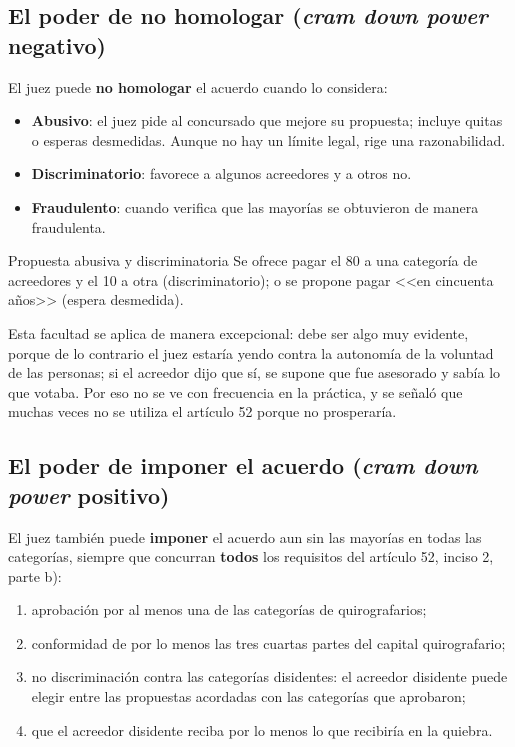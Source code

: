 \documentclass[12pt,oneside]{book}
\begin{document}
\subsection{El poder de no homologar (\emph{cram down power} negativo)}

El juez puede \textbf{no homologar} el acuerdo cuando lo considera:
\begin{itemize}
    \item \textbf{Abusivo}: el juez pide al concursado que mejore su propuesta; incluye quitas o esperas desmedidas. Aunque no hay un límite legal, rige una razonabilidad.
    \item \textbf{Discriminatorio}: favorece a algunos acreedores y a otros no.
    \item \textbf{Fraudulento}: cuando verifica que las mayorías se obtuvieron de manera fraudulenta.
\end{itemize}

\begin{example}{Propuesta abusiva y discriminatoria}
Se ofrece pagar el 80 a una categoría de acreedores y el 10 a otra (discriminatorio); o se propone pagar <<en cincuenta años>> (espera desmedida).
\end{example}

Esta facultad se aplica de manera excepcional: debe ser algo muy evidente, porque de lo contrario el juez estaría yendo contra la autonomía de la voluntad de las personas; si el acreedor dijo que sí, se supone que fue asesorado y sabía lo que votaba. Por eso no se ve con frecuencia en la práctica, y se señaló que muchas veces no se utiliza el artículo 52 porque no prosperaría.

\subsection{El poder de imponer el acuerdo (\emph{cram down power} positivo)}

El juez también puede \textbf{imponer} el acuerdo aun sin las mayorías en todas las categorías, siempre que concurran \textbf{todos} los requisitos del artículo 52, inciso 2, parte b):
\begin{enumerate}[label=\roman*)]
    \item aprobación por al menos una de las categorías de quirografarios;
    \item conformidad de por lo menos las tres cuartas partes del capital quirografario;
    \item no discriminación contra las categorías disidentes: el acreedor disidente puede elegir entre las propuestas acordadas con las categorías que aprobaron;
    \item que el acreedor disidente reciba por lo menos lo que recibiría en la quiebra.
\end{enumerate}
\end{document}

